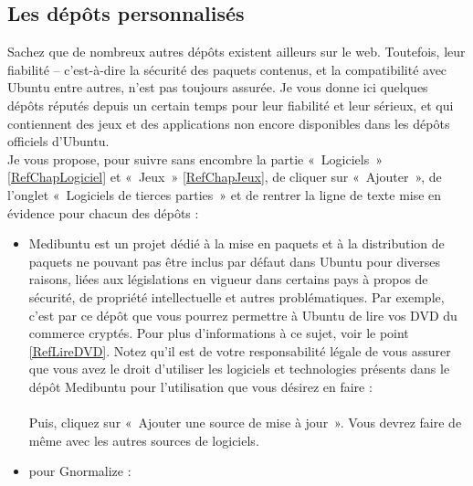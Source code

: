{\subsection{Les dépôts personnalisés}	
Sachez que de nombreux autres dépôts existent ailleurs sur le web. Toutefois, leur fiabilité -- c'est-à-dire la sécurité des paquets contenus, et la compatibilité avec Ubuntu entre autres, n'est pas toujours assurée. Je vous donne ici quelques dépôts réputés depuis un certain temps pour leur fiabilité et leur sérieux, et qui contiennent des jeux et des applications non encore disponibles dans les dépôts officiels d'Ubuntu.\\
Je vous propose, pour suivre sans encombre la partie «~Logiciels~» \ref{RefChapLogiciel} et «~Jeux~» \ref{RefChapJeux}, de cliquer sur «~Ajouter~», de l'onglet «~Logiciels de tierces parties~» et de rentrer la ligne de texte mise en évidence pour chacun des dépôts :
\begin{itemize}
\item Medibuntu est un projet dédié à la mise en paquets et à la distribution de paquets ne pouvant pas être inclus par défaut dans Ubuntu pour diverses raisons, liées aux législations en vigueur dans certains pays à propos de sécurité, de propriété intellectuelle et autres problématiques. Par exemple, c'est par ce dépôt que vous pourrez permettre à Ubuntu de lire vos DVD du commerce cryptés. Pour plus d'informations à ce sujet, voir le point \ref{RefLireDVD}. Notez qu'il est de votre responsabilité légale de vous assurer que vous avez le droit d'utiliser les logiciels et technologies présents dans le dépôt Medibuntu pour l'utilisation que vous désirez en faire :\\
\\
Puis, cliquez sur «~Ajouter une source de mise à jour~». Vous devrez faire de même avec les autres sources de logiciels.\par
\item pour Gnormalize :\\
\par
\end{itemize}\par
}
